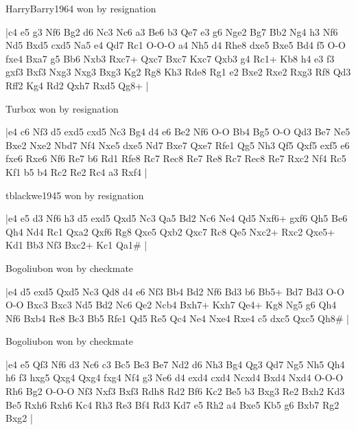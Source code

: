 \showboard

HarryBarry1964 won by resignation

\makegametitle
|c4 e5 g3 Nf6 Bg2 d6 Nc3 Nc6 a3 Be6 b3 Qe7 e3 g6 Nge2 Bg7 Bb2 Ng4 h3 Nf6 Nd5 Bxd5 cxd5 Na5 e4 Qd7 Rc1 O-O-O a4 Nh5 d4 Rhe8 dxe5 Bxe5 Bd4 f5 O-O fxe4 Bxa7 g5 Bb6 Nxb3 Rxc7+ Qxc7 Bxc7 Kxc7 Qxb3 g4 Rc1+ Kb8 h4 e3 f3 gxf3 Bxf3 Nxg3 Nxg3 Bxg3 Kg2 Rg8 Kh3 Rde8 Rg1 e2 Bxe2 Rxe2 Rxg3 Rf8 Qd3 Rff2 Kg4 Rd2 Qxh7 Rxd5 Qg8+  |

\showboard

Turbox won by resignation

\makegametitle
|e4 c6 Nf3 d5 exd5 cxd5 Nc3 Bg4 d4 e6 Be2 Nf6 O-O Bb4 Bg5 O-O Qd3 Be7 Ne5 Bxe2 Nxe2 Nbd7 Nf4 Nxe5 dxe5 Nd7 Bxe7 Qxe7 Rfe1 Qg5 Nh3 Qf5 Qxf5 exf5 e6 fxe6 Rxe6 Nf6 Re7 b6 Rd1 Rfe8 Rc7 Rec8 Re7 Re8 Rc7 Rec8 Re7 Rxc2 Nf4 Rc5 Kf1 b5 b4 Rc2 Re2 Rc4 a3 Rxf4  |

\showboard

tblackwe1945 won by resignation

\makegametitle
|e4 e5 d3 Nf6 h3 d5 exd5 Qxd5 Nc3 Qa5 Bd2 Nc6 Ne4 Qd5 Nxf6+ gxf6 Qh5 Be6 Qh4 Nd4 Rc1 Qxa2 Qxf6 Rg8 Qxe5 Qxb2 Qxc7 Rc8 Qe5 Nxc2+ Rxc2 Qxe5+ Kd1 Bb3 Nf3 Bxc2+ Kc1 Qa1\#  |

\showboard

Bogoliubon won by checkmate

\makegametitle
|e4 d5 exd5 Qxd5 Nc3 Qd8 d4 e6 Nf3 Bb4 Bd2 Nf6 Bd3 b6 Bb5+ Bd7 Bd3 O-O O-O Bxc3 Bxc3 Nd5 Bd2 Nc6 Qe2 Ncb4 Bxh7+ Kxh7 Qe4+ Kg8 Ng5 g6 Qh4 Nf6 Bxb4 Re8 Bc3 Bb5 Rfe1 Qd5 Re5 Qc4 Ne4 Nxe4 Rxe4 c5 dxc5 Qxc5 Qh8\#  |

\showboard

Bogoliubon won by checkmate

\makegametitle
|e4 e5 Qf3 Nf6 d3 Nc6 c3 Bc5 Be3 Be7 Nd2 d6 Nh3 Bg4 Qg3 Qd7 Ng5 Nh5 Qh4 h6 f3 hxg5 Qxg4 Qxg4 fxg4 Nf4 g3 Ne6 d4 exd4 cxd4 Ncxd4 Bxd4 Nxd4 O-O-O Rh6 Bg2 O-O-O Nf3 Nxf3 Bxf3 Rdh8 Rd2 Bf6 Kc2 Be5 b3 Bxg3 Re2 Bxh2 Kd3 Be5 Rxh6 Rxh6 Kc4 Rh3 Re3 Bf4 Rd3 Kd7 e5 Rh2 a4 Bxe5 Kb5 g6 Bxb7 Rg2 Bxg2  |

\showboard

